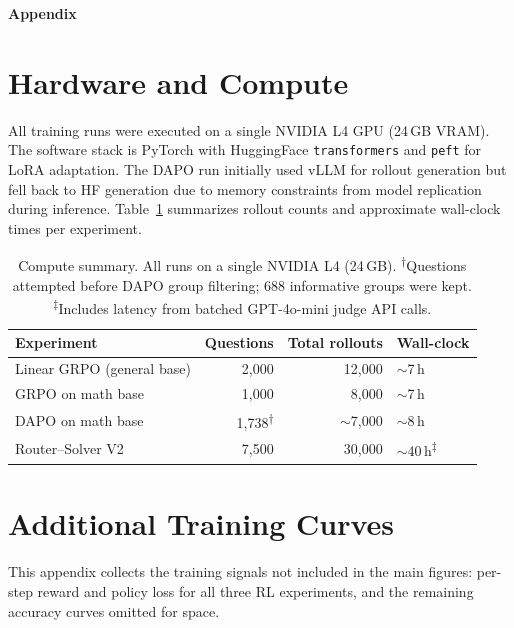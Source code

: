 \documentclass[11pt]{article}
\begin{document}
\newpage
\appendix
\begin{center}
  {\large\textbf{Appendix}}
\end{center}
\vspace{0.5em}

\section{Hardware and Compute}
\label{app:hardware}

All training runs were executed on a single NVIDIA L4 GPU (24\,GB VRAM). The software stack is PyTorch with HuggingFace \texttt{transformers} and \texttt{peft} for LoRA adaptation. The DAPO run initially used vLLM for rollout generation but fell back to HF generation due to memory constraints from model replication during inference. Table~\ref{tab:compute} summarizes rollout counts and approximate wall-clock times per experiment.

\begin{table}[h]
  \centering
  \begin{tabular}{lrrl}
    \toprule
    Experiment & Questions & Total rollouts & Wall-clock \\
    \midrule
    Linear GRPO (general base)  & 2{,}000  & 12{,}000          & $\sim$7\,h \\
    GRPO on math base           & 1{,}000  & 8{,}000           & $\sim$7\,h \\
    DAPO on math base           & 1{,}738\textsuperscript{$\dagger$} & $\sim$7{,}000 & $\sim$8\,h \\
    Router--Solver V2           & 7{,}500  & 30{,}000          & $\sim$40\,h\textsuperscript{$\ddagger$} \\
    \bottomrule
  \end{tabular}
  \caption{Compute summary. All runs on a single NVIDIA L4 (24\,GB). \textsuperscript{$\dagger$}Questions attempted before DAPO group filtering; 688 informative groups were kept. \textsuperscript{$\ddagger$}Includes latency from batched GPT-4o-mini judge API calls.}
  \label{tab:compute}
\end{table}

\section{Additional Training Curves}
\label{app:curves}

This appendix collects the training signals not included in the main figures: per-step reward and policy loss for all three RL experiments, and the remaining accuracy curves omitted for space.
\end{document}
